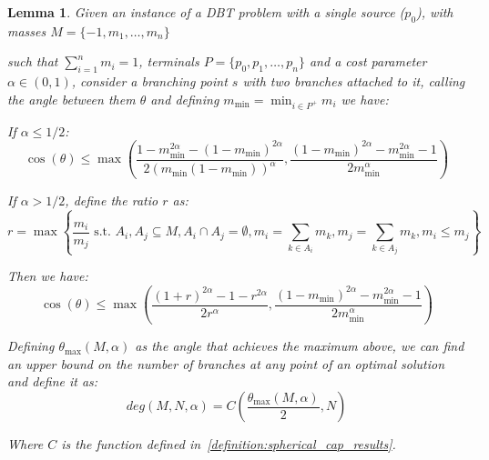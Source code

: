\documentclass[11pt,reqno,a4paper]{amsart}
\numberwithin{equation}{section}
\theoremstyle{mytheorem}
\newtheorem{lemma}[subsection]{Lemma}
\theoremstyle{myremark}
\theoremstyle{myparagraph}
\begin{document}
    \begin{lemma}
        \label{lemma:degree_definition}
        Given an instance of a DBT problem with a single source ($p_0$), with masses $M=\{-1, m_1, \dots, m_n\}$

        such that $\sum_{i =1}^{n} m_i = 1$, terminals $P=\{p_0, p_1, \dots, p_n\}$ and
        a cost parameter $\alpha \in (0,1)$, consider a branching point $s$ with two branches attached to it,
        calling the angle between them $\theta$ and defining $m_{\min} = \min_{i \in P^+} m_i$ we have:

        If $\alpha \le 1/2$:
        \begin{equation}
            \cos(\theta) \le \max\left(
            \frac{1 - m_{\min}^{2\alpha} - (1-m_{\min})^{2\alpha}}{2(m_{\min}(1-m_{\min}))^\alpha},
            \frac{(1-m_{\min})^{2\alpha} - m_{\min}^{2\alpha} - 1}{2m_{\min}^\alpha}
            \right)
        \end{equation}

        If $\alpha > 1/2$, define the ratio $r$ as:
        \begin{equation}
            \label{eq:ratio_definition}
            r = \max \left\{ \frac{m_i}{m_j} \text{  s.t.  } A_i, A_j \subseteq M, A_i \cap A_j = \emptyset, m_i = \sum_{k \in A_i} m_k, m_j = \sum_{k \in A_j} m_k, m_i \le m_j \right\}
        \end{equation}

        Then we have:
        \begin{equation}
            \cos(\theta) \le \max\left(
            \frac{ (1+r)^{2\alpha} - 1 - r^{2\alpha}}{2r^\alpha},
            \frac{(1-m_{\min})^{2\alpha} - m_{\min}^{2\alpha} - 1}{2m_{\min}^\alpha}
            \right)
        \end{equation}


        Defining $\theta_{\max}(M, \alpha)$ as the angle that achieves the maximum above, we can find an upper bound on the number of branches
        at any point of an optimal solution and define it as:
        \begin{equation}
            deg(M, N, \alpha) = C\left( \frac{ \theta_{\max}(M, \alpha) }{2}, N\right)
        \end{equation}

        Where $C$ is the function defined in~\ref{definition:spherical_cap_results}.
    \end{lemma}
\end{document}
